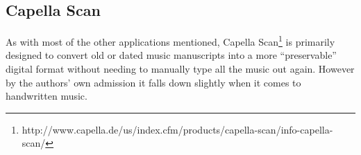 \subsection{Capella Scan}
As with most of the other applications mentioned, Capella Scan\footnote{http://www.capella.de/us/index.cfm/products/capella-scan/info-capella-scan/} is primarily designed to convert old or dated music manuscripts into a more ``preservable'' digital format without needing to manually type all the music out again. However by the authors' own admission it falls down slightly when it comes to handwritten music.